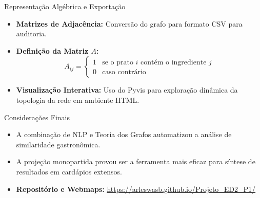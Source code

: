 \documentclass[10pt]{beamer}
\begin{document}
\begin{frame}{Representação Algébrica e Exportação}
    \begin{itemize}
        \item \textbf{Matrizes de Adjacência:} Conversão do grafo para formato CSV para auditoria.
        \item \textbf{Definição da Matriz $A$:}
        \[ A_{ij} = \begin{cases} 1 & \text{se o prato } i \text{ contém o ingrediente } j \\ 0 & \text{caso contrário} \end{cases} \]
        \item \textbf{Visualização Interativa:} Uso do Pyvis para exploração dinâmica da topologia da rede em ambiente HTML.
    \end{itemize}
\end{frame}

\begin{frame}{Considerações Finais}
    \begin{itemize}
        \item A combinação de NLP e Teoria dos Grafos automatizou a análise de similaridade gastronômica.
        \item A projeção monopartida provou ser a ferramenta mais eficaz para síntese de resultados em cardápios extensos.
        \item \textbf{Repositório e Webmaps:} \url{https://arleswasb.github.io/Projeto_ED2_P1/}
    \end{itemize}
\end{frame}
\end{document}
